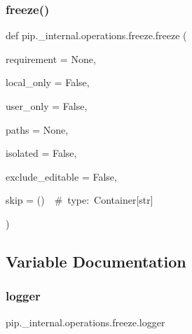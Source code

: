 \subsubsection{\texorpdfstring{freeze()}{freeze()}}
{\footnotesize\ttfamily def pip.\+\_\+internal.\+operations.\+freeze.\+freeze (\begin{DoxyParamCaption}\item[{}]{requirement = {\ttfamily None},  }\item[{}]{local\+\_\+only = {\ttfamily False},  }\item[{}]{user\+\_\+only = {\ttfamily False},  }\item[{}]{paths = {\ttfamily None},  }\item[{}]{isolated = {\ttfamily False},  }\item[{}]{exclude\+\_\+editable = {\ttfamily False},  }\item[{}]{skip = {\ttfamily ()~~\#~type\+:~Container\mbox{[}str\mbox{]}} }\end{DoxyParamCaption})}



\subsection{Variable Documentation}
\mbox{\label{namespacepip_1_1__internal_1_1operations_1_1freeze_a9af16aabecbcae08546946f45c00e541}} 
\subsubsection{\texorpdfstring{logger}{logger}}
{\footnotesize\ttfamily pip.\+\_\+internal.\+operations.\+freeze.\+logger}

